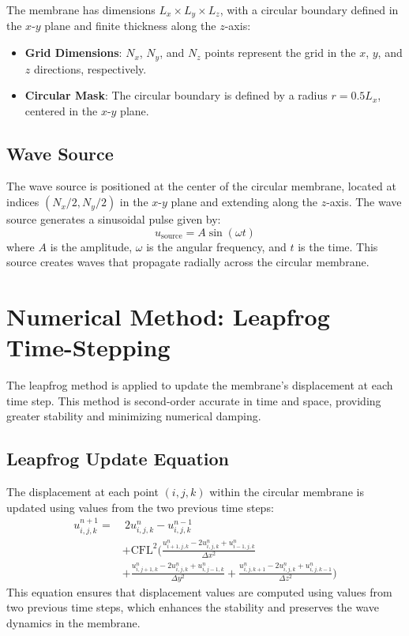 \documentclass{article}
\begin{document}
The membrane has dimensions $L_x \times L_y \times L_z$, with a circular boundary defined in the $x$-$y$ plane and finite thickness along the $z$-axis:
\begin{itemize}
    \item \textbf{Grid Dimensions}: $N_x$, $N_y$, and $N_z$ points represent the grid in the $x$, $y$, and $z$ directions, respectively.
    \item \textbf{Circular Mask}: The circular boundary is defined by a radius $r = 0.5L_x$, centered in the $x$-$y$ plane.
\end{itemize}

\subsection{Wave Source}

The wave source is positioned at the center of the circular membrane, located at indices $(N_x/2, N_y/2)$ in the $x$-$y$ plane and extending along the $z$-axis. The wave source generates a sinusoidal pulse given by:
\[
u_{\text{source}} = A \sin(\omega t)
\]
where $A$ is the amplitude, $\omega$ is the angular frequency, and $t$ is the time. This source creates waves that propagate radially across the circular membrane.

\section{Numerical Method: Leapfrog Time-Stepping}

The leapfrog method is applied to update the membrane's displacement at each time step. This method is second-order accurate in time and space, providing greater stability and minimizing numerical damping.

\subsection{Leapfrog Update Equation}

The displacement at each point $(i, j, k)$ within the circular membrane is updated using values from the two previous time steps:
\begin{align}
u_{i,j,k}^{n+1} = &\ 2 u_{i,j,k}^{n} - u_{i,j,k}^{n-1} \nonumber \\
& + \text{CFL}^2 \Bigg( \frac{u_{i+1, j, k}^n - 2 u_{i, j, k}^n + u_{i-1, j, k}^n}{\Delta x^2} \nonumber \\
& + \frac{u_{i, j+1, k}^n - 2 u_{i, j, k}^n + u_{i, j-1, k}^n}{\Delta y^2} + \frac{u_{i, j, k+1}^n - 2 u_{i, j, k}^n + u_{i, j, k-1}^n}{\Delta z^2} \Bigg)
\end{align}
This equation ensures that displacement values are computed using values from two previous time steps, which enhances the stability and preserves the wave dynamics in the membrane.
\end{document}

